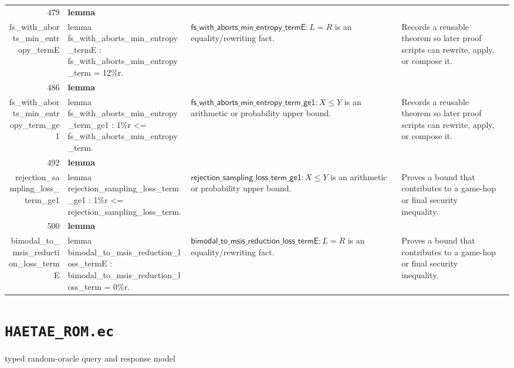 \documentclass[10pt]{article}
\newcommand{\ec}[1]{\begingroup\ttfamily\scriptsize #1\endgroup}
\begin{document}
\begin{longtable}{r L{0.17\textwidth} L{0.26\textwidth} L{0.27\textwidth} L{0.20\textwidth}}
479 & \textbf{lemma}\\\ec{fs\_with\_aborts\_min\_entropy\_termE} & \ec{lemma fs\_with\_aborts\_min\_entropy\_termE : fs\_with\_aborts\_min\_entropy\_term = 12\%r.} & \(\mathsf{fs\_with\_aborts\_min\_entropy\_termE} : L = R\) is an equality/rewriting fact. & Records a reusable theorem so later proof scripts can rewrite, apply, or compose it. \\
486 & \textbf{lemma}\\\ec{fs\_with\_aborts\_min\_entropy\_term\_ge1} & \ec{lemma fs\_with\_aborts\_min\_entropy\_term\_ge1 : 1\%r <= fs\_with\_aborts\_min\_entropy\_term.} & \(\mathsf{fs\_with\_aborts\_min\_entropy\_term\_ge1} : X \le Y\) is an arithmetic or probability upper bound. & Records a reusable theorem so later proof scripts can rewrite, apply, or compose it. \\
492 & \textbf{lemma}\\\ec{rejection\_sampling\_loss\_term\_ge1} & \ec{lemma rejection\_sampling\_loss\_term\_ge1 : 1\%r <= rejection\_sampling\_loss\_term.} & \(\mathsf{rejection\_sampling\_loss\_term\_ge1} : X \le Y\) is an arithmetic or probability upper bound. & Proves a bound that contributes to a game-hop or final security inequality. \\
500 & \textbf{lemma}\\\ec{bimodal\_to\_msis\_reduction\_loss\_termE} & \ec{lemma bimodal\_to\_msis\_reduction\_loss\_termE : bimodal\_to\_msis\_reduction\_loss\_term = 0\%r.} & \(\mathsf{bimodal\_to\_msis\_reduction\_loss\_termE} : L = R\) is an equality/rewriting fact. & Proves a bound that contributes to a game-hop or final security inequality. \\
\bottomrule
\end{longtable}

\clearpage
\section{\texorpdfstring{\texttt{HAETAE\_ROM.ec}}{HAETAE ROM.ec}}
typed random-oracle query and response model
\end{document}
